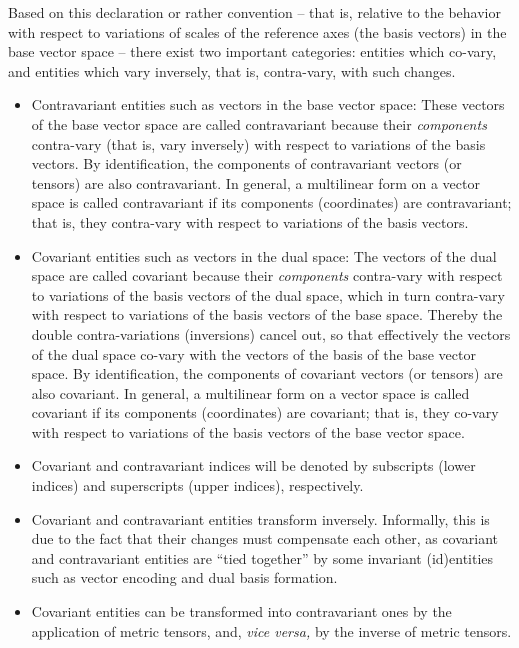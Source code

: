 Based on this declaration or rather convention
--
that is,
relative to the behavior with respect to variations of scales of the reference axes (the basis vectors) in the base vector space
--
there exist two important categories: entities which co-vary, and entities which vary inversely, that is, contra-vary, with such changes.
\begin{itemize}

\item  Contravariant entities such as vectors in the base vector space:
These vectors of the base vector space are called contravariant because
their {\em components} contra-vary (that is, vary inversely) with respect to variations of the basis vectors.
By identification, the components of contravariant vectors (or tensors) are also contravariant.
In general, a multilinear form on a vector space is called contravariant if its components
(coordinates) are contravariant; that is, they contra-vary with respect to variations of the basis vectors.

\item
Covariant entities such as vectors in the dual space:
The vectors of the dual space are called covariant because
their {\em components} contra-vary with respect to variations of the basis vectors of the dual space,
which in turn contra-vary with respect to variations of the basis vectors of the base space.
Thereby the double contra-variations (inversions) cancel out,
so that effectively the vectors of the dual space co-vary with the vectors of the basis of the base vector space.
By identification, the components of covariant vectors (or tensors) are also covariant.
In general, a multilinear form on a vector space is called covariant if its components
(coordinates) are covariant; that is, they co-vary with respect to variations of the basis vectors of the base vector space.

\item
Covariant and contravariant indices will be denoted by subscripts (lower indices) and superscripts (upper indices), respectively.

\item
Covariant and contravariant entities transform inversely.
Informally, this is due to the fact that their changes must compensate each other,
as covariant and contravariant entities are ``tied together'' by some invariant
(id)entities such as vector encoding and dual basis formation.

\item
Covariant entities can be transformed into contravariant ones
by the application of metric tensors,
and, {\it vice versa,} by the inverse of metric tensors.
\end{itemize}



